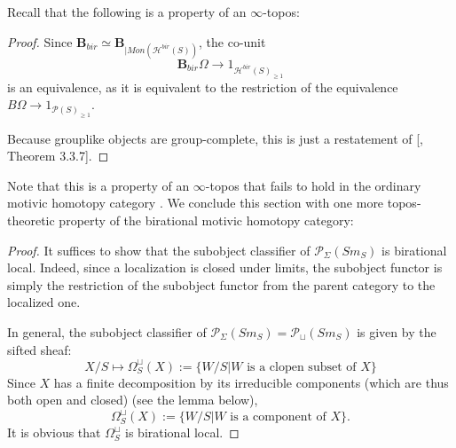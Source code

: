 Recall that the following is a property of an $\infty$-topos:
\begin{proof}
Since $\mathbf{B}_{bir}\simeq \mathbf{B}_{|Mon(\mathcal{H}^{bir}(S))}$, the co-unit $$\mathbf{B}_{bir}\Omega \to 1_{\mathcal{H}^{bir}(S)_{\geq 1} }$$ is an equivalence, as it is equivalent to the restriction of the equivalence $ B\Omega\to 1_{\mathcal{P}(S)_{\geq 1}}$. 

Because grouplike objects are group-complete, this is just a restatement of [\cite{bas}, Theorem 3.3.7].     
\end{proof}
Note that this is a property of an $\infty$-topos that fails to hold in the ordinary motivic homotopy category . 
We conclude this section with one more topos-theoretic property of the birational motivic homotopy category: 
\begin{proof}
    It suffices to show that the subobject classifier of $\mathcal{P}_{\Sigma}(Sm_S)$ is birational local. Indeed, since a localization is closed under limits, the subobject functor is simply the restriction of the subobject functor from the parent category to the localized one. 
    
    In general, the subobject classifier of $\mathcal{P}_{\Sigma}(Sm_S)=\mathcal{P}_{\sqcup}(Sm_S)$ is given by the sifted sheaf:
    $$X/S \mapsto \Omega^{\sqcup}_S(X):= \{ 
    W/S\big | W \text{  is a clopen subset of } X\}$$
    Since $X$ has a finite decomposition by its irreducible components (which are thus both open and closed) (see the lemma below), $$\Omega^{\sqcup}_S(X):= \{ 
    W/S\big | W \text{  is a component of } X\}.$$
   It is obvious that $\Omega^\sqcup _S$ is birational local.
\end{proof}
